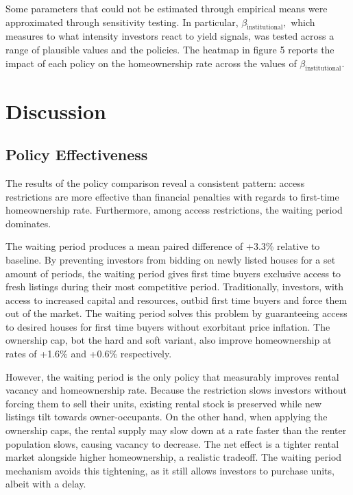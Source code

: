 \documentclass[twocolumn,showpacs,%
  nofootinbib,aps,superscriptaddress,%
  eqsecnum,prd,notitlepage,showkeys,10pt]{revtex4-1}
\begin{document}
Some parameters that could not be estimated through empirical means were approximated through sensitivity testing. In particular, $\beta_{\text{institutional}},$ which measures to what intensity investors react to yield signals, was tested across a range of plausible values and the policies. The heatmap in figure 5 reports the impact of each policy on the homeownership rate across the values of $\beta_{\text{institutional}}.$ \newline


\section{Discussion}
\subsection{Policy Effectiveness}
The results of the policy comparison reveal a consistent pattern: access restrictions are more effective than financial penalties with regards to first-time homeownership rate. Furthermore, among access restrictions, the waiting period dominates. \newline

The waiting period produces a mean paired difference of +3.3\% relative to baseline.  By preventing investors from bidding on newly listed houses for a set amount of periods, the waiting period gives first time buyers exclusive access to fresh listings during their most competitive period. Traditionally, investors, with access to increased capital and resources, outbid first time buyers and force them out of the market. The waiting period solves this problem by guaranteeing access to desired houses for first time buyers without exorbitant price inflation. The ownership cap, bot the hard and soft variant, also improve homeownership at rates of +1.6\% and +0.6\% respectively. \newline

However, the waiting period is the only policy that measurably improves rental vacancy and homeownership rate. Because the restriction slows investors without forcing them to sell their units,  existing rental stock is preserved while  new listings tilt towards owner-occupants. On the other hand, when applying the ownership caps, the rental supply may slow down at a rate faster than the renter population slows, causing vacancy to decrease. The net effect is a tighter rental market alongside higher homeownership, a realistic tradeoff. The waiting period mechanism avoids this tightening, as it still allows investors to purchase units, albeit with a delay.  \newline
\end{document}
